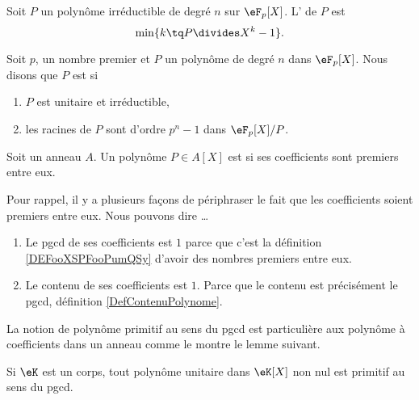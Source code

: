 \begin{definition}
    Soit \( P\) un polynôme irréductible de degré \( n\) sur \( \eF_p[X]\). L' de \( P\) est
    \begin{equation}
        \min\{ k\tq P\divides X^k-1 \}.
    \end{equation}
\end{definition}

\begin{definition}           \label{DEFooDVOOooKaPZQC}
    Soit \( p\), un nombre premier et \( P\) un polynôme de degré $n$ dans \( \eF_p[X]\). Nous disons que \( P\) est  si 
    \begin{enumerate}
        \item
            \( P\) est unitaire et irréductible,
        \item
            les racines de \( P\) sont d'ordre \( p^n-1\) dans \( \eF_p[X]/P\).
    \end{enumerate}
\end{definition}

\begin{definition}       \label{DEFooAIYGooRAEfHU}
    Soit un anneau \( A\). Un polynôme \( P\in A[X]\) est  si ses coefficients sont premiers entre eux.
\end{definition}

\begin{normaltext}
    Pour rappel, il y a plusieurs façons de périphraser le fait que les coefficients soient premiers entre eux. Nous pouvons dire \ldots
    \begin{enumerate}
        \item
            Le pgcd de ses coefficients est \( 1\) parce que c'est la définition \ref{DEFooXSPFooPumQSy} d'avoir des nombres premiers entre eux.
        \item
            Le contenu de ses coefficients est \( 1\). Parce que le contenu est précisément le pgcd, définition \ref{DefContenuPolynome}.
    \end{enumerate}
\end{normaltext}

La notion de polynôme primitif au sens du pgcd est particulière aux polynôme à coefficients dans un anneau comme le montre le lemme suivant.

\begin{lemma}
    Si \( \eK\) est un corps, tout polynôme unitaire dans \( \eK[X]\) non nul est primitif au sens du pgcd.
\end{lemma}

